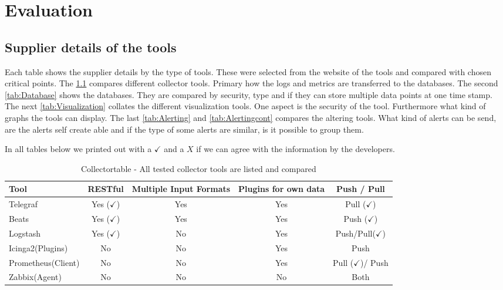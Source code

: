 \chapter{Evaluation} %
\section{Supplier details of the tools}
Each table shows the supplier details by the type of tools. These were selected from the website of the tools and compared with chosen critical points. The \cref{tab:Collector} compares different collector tools. Primary how the logs and metrics are transferred to the databases. The second \cref{tab:Database} shows the databases. They are compared by security, type and if they can store multiple data points at one time stamp. \\
The next \cref{tab:Visualization} collates the different visualization tools. One aspect is the security of the tool. Furthermore what kind of graphs the tools can display. The last \cref{tab:Alerting} and \cref{tab:Alertingcont} compares the altering tools. What kind of alerts can be send, are the alerts self create able and if the type of some alerts are similar, is it possible to group them.

In all tables below we printed out with a $ \checkmark $ and a $ X $ if we can agree with the information by the developers.


\begin{table}
\centering
\begin{tabular}{p{3cm}cccc}
\hline
Tool & RESTful & Multiple Input Formats      & Plugins for own data        & Push / Pull \\
\hline
Telegraf    & Yes ($ \checkmark $) & Yes    & Yes    &Pull    ($ \checkmark $)  \\
Beats  & Yes ($ \checkmark $)  & Yes & Yes  & Push ($ \checkmark $) \\
Logstash & Yes ($ \checkmark $)  & No & Yes & Push/Pull($\checkmark$)                         \\
Icinga2(Plugins)  & No  & No  & Yes  & Push \\
Prometheus(Client)  & No  & No  & Yes  & Pull ($ \checkmark $)/ Push\\
Zabbix(Agent) & No  & No  & No  & Both \\
\hline                        
\end{tabular}

\caption{Collectortable - All tested collector tools are listed and compared}
\label{tab:Collector}

\end{table}


